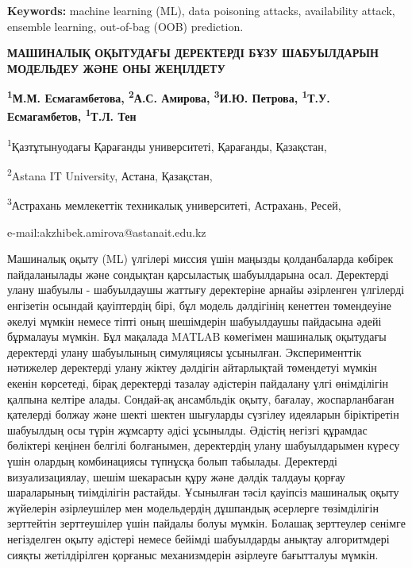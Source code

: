 {\bfseries Keywords:} machine learning (ML), data poisoning attacks,
availability attack, ensemble learning, out-of-bag (OOB) prediction.

\begin{articleheader}
{\bfseries МАШИНАЛЫҚ ОҚЫТУДАҒЫ ДЕРЕКТЕРДІ БҰЗУ ШАБУЫЛДАРЫН МОДЕЛЬДЕУ ЖӘНЕ ОНЫ ЖЕҢІЛДЕТУ}

{\bfseries
\textsuperscript{1}М.М. Есмагамбетова,
\textsuperscript{2}А.С. Амирова\textsuperscript{\envelope },
\textsuperscript{3}И.Ю. Петрова,
\textsuperscript{1}Т.У. Есмагамбетов,
\textsuperscript{1}Т.Л. Тен
}
\end{articleheader}

\begin{affiliation}
\textsuperscript{1}Қазтұтынуодағы Қарағанды университеті, Қарағанды, Қазақстан,

\textsuperscript{2}Astana IT University, Астана, Қазақстан,

\textsuperscript{3}Астрахань мемлекеттік техникалық университеті, Астрахань, Ресей,

e-mail:akzhibek.amirova@astanait.edu.kz
\end{affiliation}

Машиналық оқыту (ML) үлгілері миссия үшін маңызды қолданбаларда көбірек
пайдаланылады және сондықтан қарсыластық шабуылдарына осал. Деректерді
улану шабуылы - шабуылдаушы жаттығу деректеріне арнайы әзірленген
үлгілерді енгізетін осындай қауіптердің бірі, бұл модель дәлдігінің
кенеттен төмендеуіне әкелуі мүмкін немесе тіпті оның шешімдерін
шабуылдаушы пайдасына әдейі бұрмалауы мүмкін. Бұл мақалада MATLAB
көмегімен машиналық оқытудағы деректерді улану шабуылының симуляциясы
ұсынылған. Эксперименттік нәтижелер деректерді улану жіктеу дәлдігін
айтарлықтай төмендетуі мүмкін екенін көрсетеді, бірақ деректерді тазалау
әдістерін пайдалану үлгі өнімділігін қалпына келтіре алады. Сондай-ақ
ансамбльдік оқыту, бағалау, жоспарланбаған қателерді болжау және шекті
шектен шығуларды сүзгілеу идеяларын біріктіретін шабуылдың осы түрін
жұмсарту әдісі ұсынылды. Әдістің негізгі құрамдас бөліктері кеңінен
белгілі болғанымен, деректердің улану шабуылдарымен күресу үшін олардың
комбинациясы түпнұсқа болып табылады. Деректерді визуализациялау, шешім
шекарасын құру және дәлдік талдауы қорғау шараларының тиімділігін
растайды. Ұсынылған тәсіл қауіпсіз машиналық оқыту жүйелерін
әзірлеушілер мен модельдердің дұшпандық әсерлерге төзімділігін
зерттейтін зерттеушілер үшін пайдалы болуы мүмкін. Болашақ зерттеулер
сенімге негізделген оқыту әдістері немесе бейімді шабуылдарды анықтау
алгоритмдері сияқты жетілдірілген қорғаныс механизмдерін әзірлеуге
бағытталуы мүмкін.

